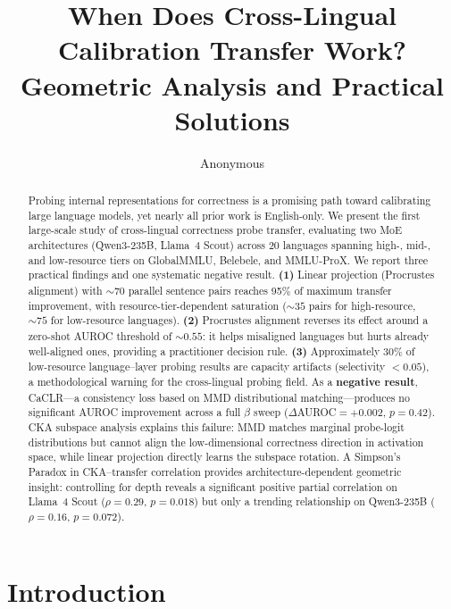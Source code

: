 \documentclass[11pt,a4paper]{article}
\title{When Does Cross-Lingual Calibration Transfer Work?\\Geometric Analysis and Practical Solutions}
\author{Anonymous}
\newcommand{\auroc}{AUROC}
\begin{document}
\maketitle

\begin{abstract}
Probing internal representations for correctness is a promising path toward calibrating large language models, yet nearly all prior work is English-only. We present the first large-scale study of cross-lingual correctness probe transfer, evaluating two MoE architectures (Qwen3-235B, Llama~4 Scout) across 20 languages spanning high-, mid-, and low-resource tiers on GlobalMMLU, Belebele, and MMLU-ProX. We report three practical findings and one systematic negative result. \textbf{(1)} Linear projection (Procrustes alignment) with ${\sim}70$ parallel sentence pairs reaches 95\% of maximum transfer improvement, with resource-tier-dependent saturation (${\sim}35$ pairs for high-resource, ${\sim}75$ for low-resource languages). \textbf{(2)} Procrustes alignment reverses its effect around a zero-shot \auroc{} threshold of ${\sim}0.55$: it helps misaligned languages but hurts already well-aligned ones, providing a practitioner decision rule. \textbf{(3)} Approximately 30\% of low-resource language--layer probing results are capacity artifacts (selectivity $<0.05$), a methodological warning for the cross-lingual probing field. As a \textbf{negative result}, CaCLR---a consistency loss based on MMD distributional matching---produces no significant \auroc{} improvement across a full $\beta$ sweep ($\Delta$\auroc{}$=+0.002$, $p=0.42$). CKA subspace analysis explains this failure: MMD matches marginal probe-logit distributions but cannot align the low-dimensional correctness direction in activation space, while linear projection directly learns the subspace rotation. A Simpson's Paradox in CKA--transfer correlation provides architecture-dependent geometric insight: controlling for depth reveals a significant positive partial correlation on Llama~4 Scout ($\rho=0.29$, $p=0.018$) but only a trending relationship on Qwen3-235B ($\rho=0.16$, $p=0.072$).
\end{abstract}

\section{Introduction}
\end{document}
